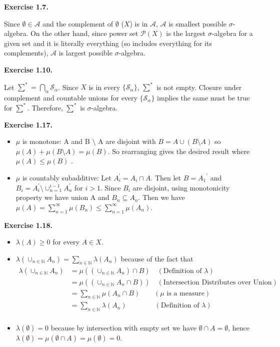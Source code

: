 \documentclass[letterpaper,12pt]{article}
\theoremstyle{definition}
\begin{document}
\begin{spacing}{1.3}{}
\textbf{Exercise 1.7.}

Since $\emptyset \in \mathcal{A}$ and the complement of $\emptyset$ ($X$) is in $\mathcal{A}$, $\mathcal{A}$ is smallest possible $\sigma$-algebra. On the other hand, since power set $\mathcal{P}(X)$ is the largest $\sigma$-algebra for a given set and it is literally everything (so includes everything for its complements), $\mathcal{A}$ is largest possible $\sigma$-algebra.

\textbf{Exercise 1.10.}

Let $\sum^{*} = \bigcap_\alpha \mathcal{S}_\alpha$. Since $X$ is in every $\{\mathcal{S}_\alpha\}$, $\sum^{*}$ is not empty. Closure under complement and countable unions for every  $\{\mathcal{S}_\alpha\}$ implies the same must be true for $\sum^{*}$.  Therefore,  $\sum^{*}$ is $\sigma$-algebra.

\textbf{Exercise 1.17.}

\begin{itemize}
\item $\mu$ is monotone: A and B $\setminus$ A are disjoint with $B = A \cup (B \setminus A)$ so $\mu(A) + \mu (B \setminus A) = \mu(B)$. So rearranging gives the desired result where $\mu(A) \leq \mu(B)$  .

\item  $\mu$ is countably subadditive: Let $A_{i}^{'} = A_{i} \cap A$. Then let $B = {A_{1}}^{'}$ and $B_{i} = A_{i}^{'} \setminus \cup_{n=1}^{i-1} A_{n}^{'}$ for $i>1$. Since $B_{i}$ are disjoint, using monotonicity property we have union A and $B_{n} \subseteq A_{n}$. Then we have $\mu(A) = \sum_{n=1}^{\infty} \mu({B_{n}}) \leq  \sum_{n=1}^{\infty} \mu({A_{n}})$.

\end{itemize}

\textbf{Exercise 1.18.}
\begin{itemize}
\item $\lambda(A) \geq 0$ for every $A \in X$.
\item $\lambda(\cup_{n \in \mathbb{N}} A_{n}) = \sum_{n \in \mathbb{N}} \lambda(A_{n})$ because of the fact that 
\begin{align*}
\lambda(\cup_{n \in \mathbb{N}} A_{n}) & = \mu((\cup_{n \in \mathbb{N}} A_{n}) \cap B) \quad (\text{Definition of $\lambda$})\\ & = \mu((\cup_{n \in \mathbb{N}} A_{n} \cap B)) \quad (\text{Intersection Distributes over Union})\\ & = \sum_{n \in \mathbb{N}} \mu(A_{n} \cap B)  \quad \quad (\text{$\mu$ is a measure}) \\ & = \sum_{n \in \mathbb{N}} \lambda(A_{n}) \quad \quad \quad \quad (\text{Definition of $\lambda$})\\
\end{align*}
\item  $\lambda(\emptyset) = 0$ because by intersection with empty set we have $\emptyset \cap A = \emptyset$, hence $\lambda(\emptyset) = \mu(\emptyset \cap A) =  \mu(\emptyset) = 0$.


\end{itemize}
\end{spacing}
\end{document}
